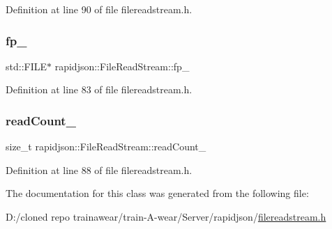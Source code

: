 Definition at line 90 of file filereadstream.\+h.

\mbox{\label{classrapidjson_1_1_file_read_stream_accd951049f91a32dd700414754584200}} 
\subsubsection{\texorpdfstring{fp\_}{fp\_}}
{\footnotesize\ttfamily std\+::\+F\+I\+LE$\ast$ rapidjson\+::\+File\+Read\+Stream\+::fp\+\_\+\hspace{0.3cm}{\ttfamily [private]}}



Definition at line 83 of file filereadstream.\+h.

\mbox{\label{classrapidjson_1_1_file_read_stream_a2e36a566d23ef19ffa4eb16e0a390cff}} 
\subsubsection{\texorpdfstring{readCount\_}{readCount\_}}
{\footnotesize\ttfamily size\+\_\+t rapidjson\+::\+File\+Read\+Stream\+::read\+Count\+\_\+\hspace{0.3cm}{\ttfamily [private]}}



Definition at line 88 of file filereadstream.\+h.



The documentation for this class was generated from the following file\+:\begin{DoxyCompactItemize}
\item 
D\+:/cloned repo trainawear/train-\/\+A-\/wear/\+Server/rapidjson/\mbox{\hyperlink{filereadstream_8h}{filereadstream.\+h}}\end{DoxyCompactItemize}

